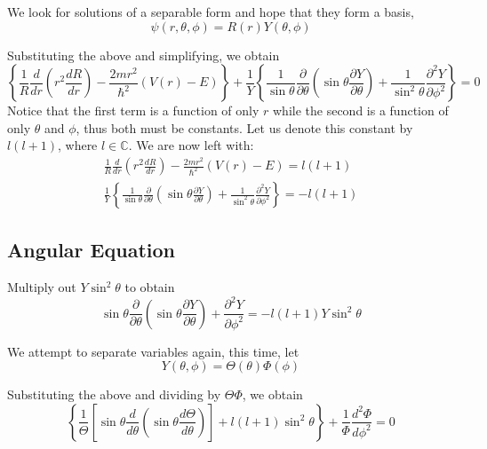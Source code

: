 We look for solutions of a separable form and hope that they form a basis,
\begin{equation*}
    \psi(r,\theta,\phi) = R(r)Y(\theta,\phi)
\end{equation*}

Substituting the above and simplifying, we obtain
\begin{equation*}
    \left\{\frac{1}{R}\frac{d}{dr}\left(r^2\frac{dR}{dr}\right) - \frac{2mr^2}{\hbar^2}(V(r) - E)\right\} + \frac{1}{Y}\left\{\frac{1}{\sin\theta}\frac{\partial}{\partial\theta}\left(\sin\theta\frac{\partial Y}{\partial\theta}\right) + \frac{1}{\sin^2\theta}\frac{\partial^2 Y}{\partial\phi^2}\right\}=0
\end{equation*}
Notice that the first term is a function of only $r$ while the second is a function of only $\theta$ and $\phi$, thus both must be constants. Let us denote this constant by $l(l + 1)$, where $l\in\mathbb{C}$. We are now left with:
\begin{align*}
    \frac{1}{R}\frac{d}{dr}\left(r^2\frac{dR}{dr}\right) - \frac{2mr^2}{\hbar^2}(V(r) - E) = l(l + 1)\\
    \frac{1}{Y}\left\{\frac{1}{\sin\theta}\frac{\partial}{\partial\theta}\left(\sin\theta\frac{\partial Y}{\partial\theta}\right) + \frac{1}{\sin^2\theta}\frac{\partial^2 Y}{\partial\phi^2}\right\} = -l(l + 1)
\end{align*}

\subsection{Angular Equation}
Multiply out $Y\sin^2\theta$ to obtain 
\begin{equation*}
    \sin\theta\frac{\partial}{\partial\theta}\left(\sin\theta\frac{\partial Y}{\partial\theta}\right) + \frac{\partial^2 Y}{\partial\phi^2} = -l(l + 1)Y\sin^2\theta
\end{equation*}

We attempt to separate variables again, this time, let 
\begin{equation*}
    Y(\theta,\phi) = \Theta(\theta)\Phi(\phi)
\end{equation*}

Substituting the above and dividing by $\Theta\Phi$, we obtain
\begin{equation*}
    \left\{\frac{1}{\Theta}\left[\sin\theta\frac{d}{d\theta}\left(\sin\theta\frac{d\Theta}{d\theta}\right)\right] + l(l + 1)\sin^2\theta\right\} + \frac{1}{\Phi}\frac{d^2\Phi}{d\phi^2} = 0
\end{equation*}

